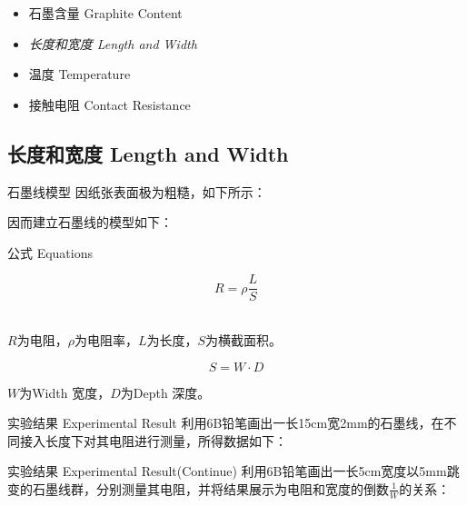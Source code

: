 \documentclass[10pt]{beamer}
\begin{document}
	
	\begin{frame}%
		\begin{itemize}
			
			\item 石墨含量 Graphite Content
			\item {\LARGE \textit{长度和宽度 Length and Width}}
			\item 温度 Temperature
			\item 接触电阻 Contact Resistance
		\end{itemize}
	\end{frame}
	
	
	\subsection{长度和宽度 Length and Width}
	\begin{frame}{石墨线模型}
		因纸张表面极为粗糙，如下所示：
	
		因而建立石墨线的模型如下：
		
		
	\end{frame}
	\begin{frame}{公式 Equations}
		\begin{theorem}
			$$R=\rho\frac{L}{S}$$ \\
			\begin{center}
				$ R $为电阻，$ \rho $为电阻率，$ L $为长度，$ S $为横截面积。
			\end{center}
		\end{theorem}
		\pause
		\begin{theorem}
			$$ S=W\cdot D $$
			\begin{center}
				$W$为Width 宽度，$ D $为Depth 深度。
			\end{center}
		\end{theorem}
	\end{frame}
	
	
	\begin{frame}{实验结果 Experimental Result}
		利用6B铅笔画出一长15cm宽2mm的石墨线，在不同接入长度下对其电阻进行测量，所得数据如下：
		
	\end{frame}
	
	
	\begin{frame}{实验结果 Experimental Result(Continue)}
		利用6B铅笔画出一长5cm宽度以5mm跳变的石墨线群，分别测量其电阻，并将结果展示为电阻和宽度的倒数$ \frac{1}{W} $的关系：
		
	\end{frame}
	
\end{document}
